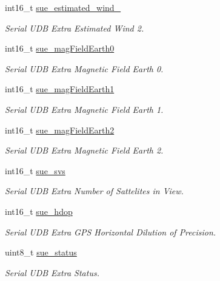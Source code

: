\begin{DoxyCompactItemize}
int16\+\_\+t \hyperlink{struct____mavlink__serial__udb__extra__f2__a__t_a636facf0fbcc6c4f4ca981a11dce57ea}{sue\+\_\+estimated\+\_\+wind\+\_}
\begin{DoxyCompactList}\small\item\em Serial U\+D\+B Extra Estimated Wind 2. \end{DoxyCompactList}\item 
int16\+\_\+t \hyperlink{struct____mavlink__serial__udb__extra__f2__a__t_ac05bdf7c83995e57024e9e749949ef51}{sue\+\_\+mag\+Field\+Earth0}
\begin{DoxyCompactList}\small\item\em Serial U\+D\+B Extra Magnetic Field Earth 0. \end{DoxyCompactList}\item 
int16\+\_\+t \hyperlink{struct____mavlink__serial__udb__extra__f2__a__t_a17bc827f0d2157a61720d877beb5142b}{sue\+\_\+mag\+Field\+Earth1}
\begin{DoxyCompactList}\small\item\em Serial U\+D\+B Extra Magnetic Field Earth 1. \end{DoxyCompactList}\item 
int16\+\_\+t \hyperlink{struct____mavlink__serial__udb__extra__f2__a__t_ab5c95a311cf7d93982780b08dceb7a93}{sue\+\_\+mag\+Field\+Earth2}
\begin{DoxyCompactList}\small\item\em Serial U\+D\+B Extra Magnetic Field Earth 2. \end{DoxyCompactList}\item 
int16\+\_\+t \hyperlink{struct____mavlink__serial__udb__extra__f2__a__t_a77dba7489be093008da569840b898847}{sue\+\_\+svs}
\begin{DoxyCompactList}\small\item\em Serial U\+D\+B Extra Number of Sattelites in View. \end{DoxyCompactList}\item 
int16\+\_\+t \hyperlink{struct____mavlink__serial__udb__extra__f2__a__t_aea4756309b62d6acd8ed6d645c786989}{sue\+\_\+hdop}
\begin{DoxyCompactList}\small\item\em Serial U\+D\+B Extra G\+P\+S Horizontal Dilution of Precision. \end{DoxyCompactList}\item 
uint8\+\_\+t \hyperlink{struct____mavlink__serial__udb__extra__f2__a__t_a6566cdb6aa0534ee66a6f257b71b988e}{sue\+\_\+status}
\begin{DoxyCompactList}\small\item\em Serial U\+D\+B Extra Status. \end{DoxyCompactList}\end{DoxyCompactItemize}


